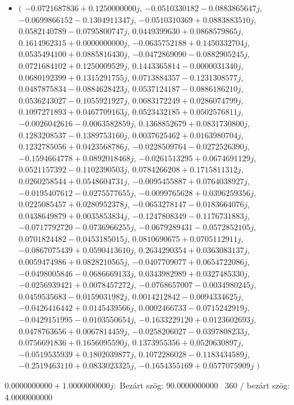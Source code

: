 \documentclass[14pt,a4paper]{article}
\begin{document}
\begin{itemize}
\item
$\big($
$-0.0721687836+0.1250000000j$, $-0.0510330182-0.0883865647j$, $-0.0699866152-0.1304911347j$, $-0.0510310369+0.0883883510j$, $0.0582140789-0.0795800747j$, $0.0449399630+0.0868579865j$, $0.1614962315+0.0000000000j$, $-0.0635752188+0.1450332704j$, $0.0535494100+0.0885816430j$, $-0.0472869090-0.0882905245j$, $0.0721684102+0.1250009529j$, $0.1443365814-0.0000031340j$, $0.0680192399+0.1315291755j$, $0.0713884357-0.1231308577j$, $0.0487875834-0.0884628423j$, $0.0537124187-0.0886186210j$, $0.0536243027-0.1055921927j$, $0.0683172249+0.0286074799j$, $0.1097271893+0.0467709163j$, $0.0523432185+0.0502576811j$, $-0.0026042616-0.0063582859j$, $0.1368852679+0.0831730800j$, $0.1283208537-0.1389753160j$, $0.0037625462+0.0163980704j$, $0.1232785056+0.0423568786j$, $-0.0228509764-0.0272526390j$, $-0.1594664778+0.0892018468j$, $-0.0261513295+0.0674691129j$, $0.0521157392-0.1102390503j$, $0.0784266208+0.1715811312j$, $0.0260258544+0.0548604731j$, $-0.0095455887+0.0764038927j$, $-0.0195407612-0.0275577655j$, $-0.0099765628+0.0396259356j$, $0.0225085457+0.0280952378j$, $-0.0653278147-0.0183664076j$, $0.0438649879+0.0035853834j$, $-0.1247808349-0.1176731883j$, $-0.0717792720-0.0736966255j$, $-0.0679289431-0.0572852105j$, $0.0701824482-0.0453185015j$, $0.0810690675+0.0705112911j$, $-0.0867075439+0.0590413610j$, $0.2634290354+0.0363083137j$, $0.0059474986+0.0828210565j$, $-0.0407709077+0.0654722086j$, $-0.0498005846-0.0686669133j$, $0.0343982989+0.0327485330j$, $-0.0256939421+0.0078457272j$, $-0.0768657007-0.0034980245j$, $0.0459535683-0.0159031982j$, $0.0014212842-0.0094334625j$, $-0.0426416442+0.0145439566j$, $0.0002466733-0.0715242919j$, $-0.0429151995-0.0103550654j$, $-0.1633229120+0.0123602693j$, $0.0478763656+0.0067814459j$, $-0.0258206027-0.0397808233j$, $0.0756691836+0.1656095590j$, $0.1373955356+0.0520630897j$, $-0.0519535939+0.1802039877j$, $0.1072286028-0.1183434589j$, $-0.2519463110+0.0833023325j$, $-0.1654355169+0.0577075909j$
$\big)$
\end{itemize}
$0.0000000000+1.0000000000j$:\
Bezárt szög: $90.0000000000$ \
360 / bezárt szög: $4.0000000000$\
\end{document}
